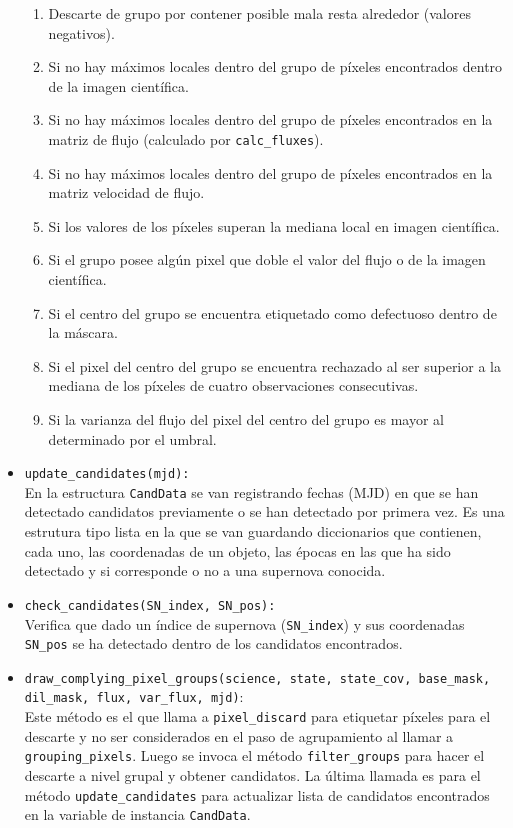 \begin{appendix}
\begin{itemize}
\begin{enumerate}
\item Descarte de grupo por contener posible mala resta alrededor (valores negativos).  
\item	Si no hay m\'aximos locales dentro del grupo de p\'ixeles encontrados dentro de la imagen cient\'ifica.
\item	Si no hay m\'aximos locales dentro del grupo de p\'ixeles encontrados en la matriz de flujo (calculado por \texttt{calc\_fluxes}).
\item	Si no hay m\'aximos locales dentro del grupo de p\'ixeles encontrados en la matriz velocidad de flujo.
\item 	Si los valores de los p\'ixeles superan la mediana local en imagen cient\'ifica.
\item	Si el grupo posee alg\'un pixel que doble el valor del flujo o de la imagen cient\'ifica.
\item	Si el centro del grupo se encuentra etiquetado como defectuoso dentro de la m\'ascara.
\item	Si el pixel del centro del grupo se encuentra rechazado al ser superior a la mediana de los p\'ixeles de cuatro observaciones consecutivas.
\item	Si la varianza del flujo del pixel del centro del grupo es mayor al determinado por el umbral.
\end{enumerate} 
\item \texttt{update\_candidates(mjd):}\\
En la estructura \texttt{CandData} se van registrando fechas (MJD) en que se han detectado candidatos previamente o se han detectado por primera vez. Es una estrutura tipo lista en la que se van guardando diccionarios que contienen, cada uno, las coordenadas de un objeto, las \'epocas en las que ha sido detectado y si corresponde o no a una supernova conocida.

\item \texttt{check\_candidates(SN\_index, SN\_pos):}\\
Verifica que dado un \'indice de supernova (\texttt{SN\_index}) y sus coordenadas \texttt{SN\_pos} se ha detectado dentro de los candidatos encontrados. 

\item \texttt{draw\_complying\_pixel\_groups(science, state, state\_cov, base\_mask, dil\_mask, flux, var\_flux, mjd)}:\\
Este m\'etodo es el que llama a \texttt{pixel\_discard} para etiquetar p\'ixeles para el descarte y no ser considerados en el paso de agrupamiento al llamar a \texttt{grouping\_pixels}. Luego se invoca el m\'etodo \texttt{filter\_groups} para hacer el descarte a nivel grupal y obtener candidatos. La \'ultima llamada es para el m\'etodo \texttt{update\_candidates} para actualizar lista de candidatos encontrados en la variable de instancia \texttt{CandData}.
\bigskip


\end{itemize}
\end{appendix}
